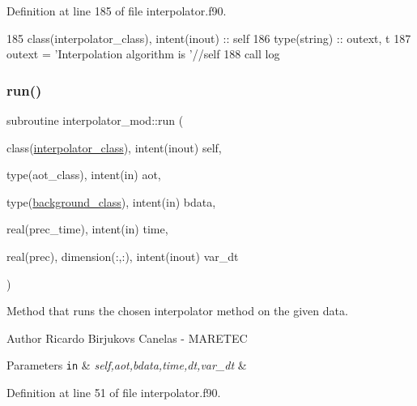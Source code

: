 Definition at line 185 of file interpolator.\+f90.


\begin{DoxyCode}
185     \textcolor{keywordtype}{class}(interpolator\_class), \textcolor{keywordtype}{intent(inout)} :: self
186     \textcolor{keywordtype}{type}(string) :: outext, t
187     outext = \textcolor{stringliteral}{'Interpolation algorithm is '}//self%
188     \textcolor{keyword}{call }log%
\end{DoxyCode}
\mbox{\label{namespaceinterpolator__mod_ab4d61e34f8feebf8c75e988a6c7cac85}} 
\subsubsection{\texorpdfstring{run()}{run()}}
{\footnotesize\ttfamily subroutine interpolator\+\_\+mod\+::run (\begin{DoxyParamCaption}\item[{class(\mbox{\hyperlink{structinterpolator__mod_1_1interpolator__class}{interpolator\+\_\+class}}), intent(inout)}]{self,  }\item[{type(aot\+\_\+class), intent(in)}]{aot,  }\item[{type(\mbox{\hyperlink{structbackground__mod_1_1background__class}{background\+\_\+class}}), intent(in)}]{bdata,  }\item[{real(prec\+\_\+time), intent(in)}]{time,  }\item[{real(prec), dimension(\+:,\+:), intent(inout)}]{var\+\_\+dt }\end{DoxyParamCaption})\hspace{0.3cm}{\ttfamily [private]}}



Method that runs the chosen interpolator method on the given data. 

\begin{DoxyAuthor}{Author}
Ricardo Birjukovs Canelas -\/ M\+A\+R\+E\+T\+EC 
\end{DoxyAuthor}

\begin{DoxyParams}[1]{Parameters}
\mbox{\tt in}  & {\em self,aot,bdata,time,dt,var\+\_\+dt} & \\
\hline
\end{DoxyParams}


Definition at line 51 of file interpolator.\+f90.


